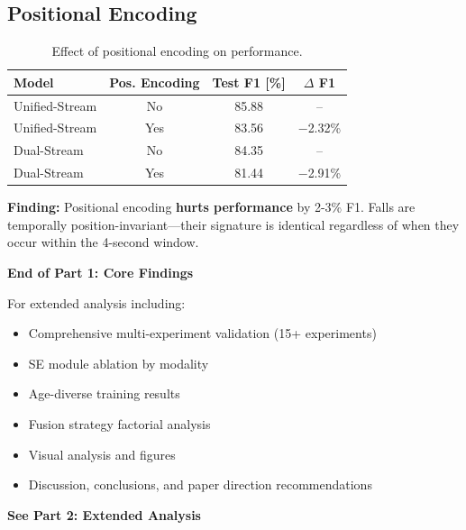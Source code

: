 \documentclass{article}
\begin{document}
\subsection{Positional Encoding}

\begin{table}[htbp]
    \centering
    \caption{Effect of positional encoding on performance.}
    \label{tab:pos_enc}
    \begin{tabular}{lccc}
        \toprule
        \textbf{Model} & \textbf{Pos. Encoding} & \textbf{Test F1 [\%]} & \textbf{$\Delta$ F1} \\
        \midrule
        Unified-Stream & No & 85.88 & -- \\
        Unified-Stream & Yes & 83.56 & $-$2.32\% \\
        Dual-Stream & No & 84.35 & -- \\
        Dual-Stream & Yes & 81.44 & $-$2.91\% \\
        \bottomrule
    \end{tabular}
\end{table}

\textbf{Finding:} Positional encoding \textbf{hurts performance} by 2-3\% F1. Falls are temporally position-invariant---their signature is identical regardless of when they occur within the 4-second window.

\vspace{2cm}
\begin{tcolorbox}[colback=gray!10,colframe=gray!50!black]
\textbf{End of Part 1: Core Findings}

For extended analysis including:
\begin{itemize}
    \item Comprehensive multi-experiment validation (15+ experiments)
    \item SE module ablation by modality
    \item Age-diverse training results
    \item Fusion strategy factorial analysis
    \item Visual analysis and figures
    \item Discussion, conclusions, and paper direction recommendations
\end{itemize}

\textbf{See Part 2: Extended Analysis}
\end{tcolorbox}
\end{document}
